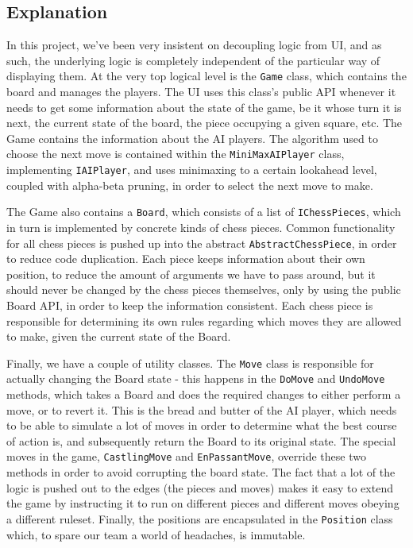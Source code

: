 \documentclass{article}
\begin{document}
\subsection*{Explanation}

In this project, we've been very insistent on decoupling logic from UI, and as such, the underlying logic is completely independent of the particular way of displaying them. At the very top logical level is the \texttt{Game} class, which contains the board and manages the players. The UI uses this class's public API whenever it needs to get some information about the state of the game, be it whose turn it is next, the current state of the board, the piece occupying a given square, etc. The Game contains the information about the AI players. The algorithm used to choose the next move is contained within the \texttt{MiniMaxAIPlayer} class, implementing \texttt{IAIPlayer}, and uses minimaxing to a certain lookahead level, coupled with alpha-beta pruning, in order to select the next move to make.

The Game also contains a \texttt{Board}, which consists of a list of \texttt{IChessPieces}, which in turn is implemented by concrete kinds of chess pieces. Common functionality for all chess pieces is pushed up into the abstract \texttt{AbstractChessPiece}, in order to reduce code duplication. Each piece keeps information about their own position, to reduce the amount of arguments we have to pass around, but it should never be changed by the chess pieces themselves, only by using the public Board API, in order to keep the information consistent. Each chess piece is responsible for determining its own rules regarding which moves they are allowed to make, given the current state of the Board.

Finally, we have a couple of utility classes. The \texttt{Move} class is responsible for actually changing the Board state - this happens in the \texttt{DoMove} and \texttt{UndoMove} methods, which takes a Board and does the required changes to either perform a move, or to revert it. This is the bread and butter of the AI player, which needs to be able to simulate a lot of moves in order to determine what the best course of action is, and subsequently return the Board to its original state. The special moves in the game, \texttt{CastlingMove} and \texttt{EnPassantMove}, override these two methods in order to avoid corrupting the board state. The fact that a lot of the logic is pushed out to the edges (the pieces and moves) makes it easy to extend the game by instructing it to run on different pieces and different moves obeying a different ruleset. Finally, the positions are encapsulated in the \texttt{Position} class which, to spare our team a world of headaches, is immutable.\\
\end{document}

